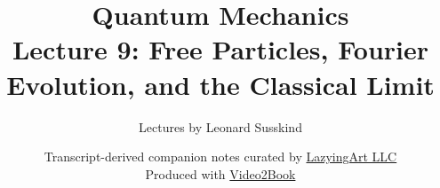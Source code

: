 \documentclass[11pt,oneside]{book}
\begin{document}
\hypersetup{pageanchor=false}
\frontmatter
\title{Quantum Mechanics\\[0.45em]
\large Lecture 9: Free Particles, Fourier Evolution, and the Classical Limit}
\author{Lectures by Leonard Susskind}
\date{Transcript-derived companion notes curated by
\href{https://lazying.art}{LazyingArt LLC}\\[0.35em]
\small Produced with
\href{https://github.com/lachlanchen/Video2Book}{Video2Book}}
\maketitle
\hypersetup{pageanchor=true}
\mainmatter

\end{document}

